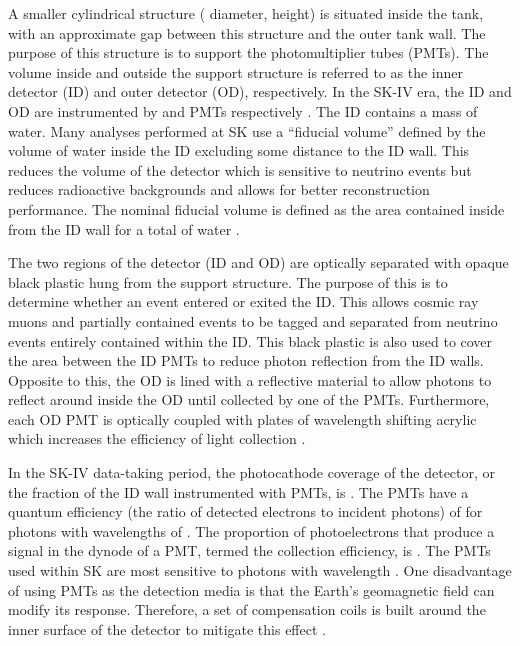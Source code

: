 A smaller cylindrical structure ( diameter,  height) is situated inside the tank, with an approximate  gap between this structure and the outer tank wall. The purpose of this structure is to support the photomultiplier tubes (PMTs). The volume inside and outside the support structure is referred to as the inner detector (ID) and outer detector (OD), respectively. In the SK-IV era, the ID and OD are instrumented by   and   PMTs respectively \cite{Abe_2014_SKCalib}. The ID contains a  mass of water. Many analyses performed at SK use a ``fiducial volume'' defined by the volume of water inside the ID excluding some distance to the ID wall. This reduces the volume of the detector which is sensitive to neutrino events but reduces radioactive backgrounds and allows for better reconstruction performance. The nominal fiducial volume is defined as the area contained inside  from the ID wall for a total of  water \cite{Jiang2019-iw}.

The two regions of the detector (ID and OD) are optically separated with opaque black plastic hung from the support structure. The purpose of this is to determine whether an event entered or exited the ID. This allows cosmic ray muons and partially contained events to be tagged and separated from neutrino events entirely contained within the ID. This black plastic is also used to cover the area between the ID PMTs to reduce photon reflection from the ID walls. Opposite to this, the OD is lined with a reflective material to allow photons to reflect around inside the OD until collected by one of the PMTs. Furthermore, each OD PMT is optically coupled with  plates of wavelength shifting acrylic which increases the efficiency of light collection \cite{Fukuda2003-ly}.

In the SK-IV data-taking period, the photocathode coverage of the detector, or the fraction of the ID wall instrumented with PMTs, is  \cite{Fukuda2003-ly}. The PMTs have a quantum efficiency (the ratio of detected electrons to incident photons) of  for photons with wavelengths of  \cite{Suzuki1993}. The proportion of photoelectrons that produce a signal in the dynode of a PMT, termed the collection efficiency, is  \cite{Fukuda2003-ly}. The PMTs used within SK are most sensitive to photons with wavelength  \cite{Fukuda2003-ly}. One disadvantage of using PMTs as the detection media is that the Earth's geomagnetic field can modify its response. Therefore, a set of compensation coils is built around the inner surface of the detector to mitigate this effect \cite{t2k_sk}.

